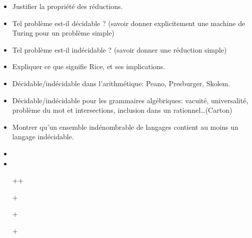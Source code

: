 \documentclass{agregfiche}
\begin{document}
\secquestionsclassiques
\begin{itemize}
\item Justifier la propriété des réductions.
\item Tel problème est-il décidable ? (savoir donner explicitement une machine de Turing pour un problème simple)
\item Tel problème est-il indécidable ? (savoir donner une réduction simple)
\item Expliquer ce que signifie Rice, et ses implications.
\item Décidable/indécidable dans l'arithmétique: Peano, Presburger, Skolem.
\item Décidable/indécidable pour les grammaires algébriques: vacuité,
  universalité, problème du mot et intersections, inclusion dans un
  rationnel\dots (Carton)
\item Montrer qu'un ensemble indénombrable de langages contient au
  moins un langage indécidable.
\end{itemize}

\secreferences
\begin{itemize}
\item 
\item 
\end{itemize}

\secdev
\begin{itemize}
    \item[++] 
\item[+] 
\item[+] 
\item[+] 

\end{itemize}
\end{document}
